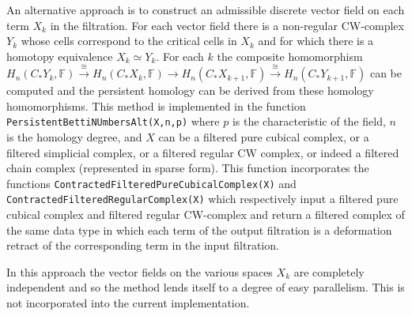 \documentclass[a4paper,11pt]{report}
\begin{document}
{{An alternative approach is to construct an admissible discrete vector field on
each term $X_k$ in the filtration. For each vector field there is a non-regular CW-complex $Y_k$ whose cells correspond to the critical cells in $X_k$ and for which there is a homotopy equivalence $X_k\simeq Y_k$. For each $k$ the composite homomorphism $H_n(C_\ast Y_k, \mathbb F) \stackrel{\cong}{\rightarrow} H_n(C_\ast X_k,
\mathbb F) \rightarrow H_n(C_\ast X_{k+1}, \mathbb F)
\stackrel{\cong}{\rightarrow} H_n(C_\ast Y_{k+1}, \mathbb F)$ can be computed and the persistent homology can be derived from these homology
homomorphisms. This method is implemented in the function \texttt{PersistentBettiNUmbersAlt(X,n,p)} where $p$ is the characteristic of the field, $n$ is the homology degree, and $X$ can be a filtered pure cubical complex, or a filtered simplicial complex, or a
filtered regular CW complex, or indeed a filtered chain complex (represented
in sparse form). This function incorporates the functions \texttt{ContractedFilteredPureCubicalComplex(X)} and \texttt{ContractedFilteredRegularComplex(X)} which respectively input a filtered pure cubical complex and filtered regular
CW-complex and return a filtered complex of the same data type in which each
term of the output filtration is a deformation retract of the corresponding
term in the input filtration. 

In this approach the vector fields on the various spaces $X_k$ are completely independent and so the method lends itself to a degree of easy
parallelism. This is not incorporated into the current implementation. 

}}
\end{document}
